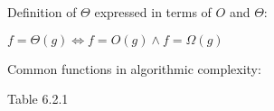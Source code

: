 \documentclass[]{exam}
\begin{document}
\begin{questions}
    \question Definition of $\Theta$ expressed in terms of $O$ and $\Theta$:
      \begin{solution}
        $f=\Theta(g) \iff f=O(g) \land f=\Omega(g)$
      \end{solution}

    \question Common functions in algorithmic complexity:
      \begin{solution}
        Table 6.2.1
      \end{solution}
  \end{questions}
\end{document}
